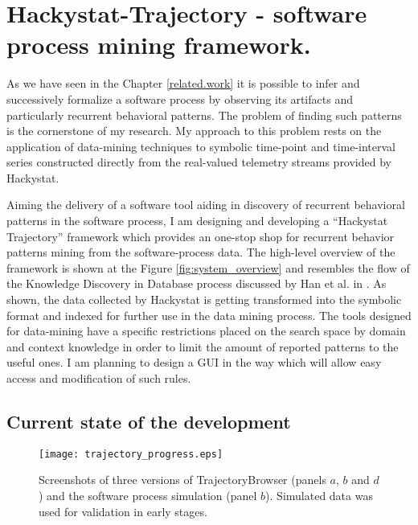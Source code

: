 \chapter{Hackystat-Trajectory - software process mining framework.} \label{trajectory}
As we have seen in the Chapter \ref{related.work} it is possible to infer and successively formalize a software process by observing its artifacts and particularly recurrent behavioral patterns. The problem of finding such patterns is the cornerstone of my research. My approach to this problem rests on the application of data-mining techniques to symbolic time-point and time-interval series constructed directly from the real-valued telemetry streams provided by Hackystat.

Aiming the delivery of a software tool aiding in discovery of recurrent behavioral patterns in the software process, I am designing and developing a ``Hackystat Trajectory'' framework which provides an one-stop shop for recurrent behavior patterns mining from the software-process data. The high-level overview of the framework is shown at the Figure \ref{fig:system_overview} and resembles the flow of the Knowledge Discovery in Database process discussed by Han et al. in \cite{citeulike:709476}. As shown, the data collected by Hackystat is getting transformed into the symbolic format and indexed for further use in the data mining process. The tools designed for data-mining have a specific restrictions placed on the search space by domain and context knowledge in order to limit the amount of reported patterns to the useful ones. I am planning to design a GUI in the way which will allow easy access and modification of such rules. 

\section{Current state of the development}

\begin{figure}[tbp]
   \centering
   \texttt{[image: trajectory\_progress.eps]}
   \caption{Screenshots of three versions of TrajectoryBrowser (panels $a$, $b$ and $d$) and the software process simulation (panel $b$). Simulated data was used for validation in early stages.}
   \label{fig:trajectory_progress}
\end{figure}

